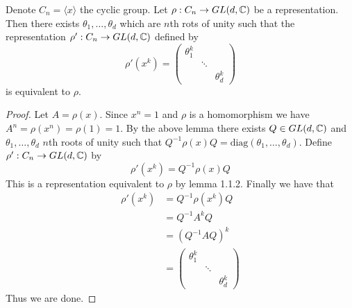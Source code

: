 \documentclass[a4paper]{article}
\begin{document}
\begin{thm}{}{} Denote $C_n=\langle x\rangle$ the cyclic group. Let $\rho:C_n\to GL(d,\mathbb{C})$ be a representation. Then there exists $\theta_1,\dots,\theta_d$ which are $n$th rots of unity such that the representation $\rho':C_n\to GL(d,\mathbb{C})$ defined by $$\rho'(x^k)=\begin{pmatrix}
\theta_1^k & & \\
& \ddots &\\
& & \theta_d^k
\end{pmatrix}$$ is equivalent to $\rho$. \tcbline
\begin{proof}
Let $A=\rho(x)$. Since $x^n=1$ and $\rho$ is a homomorphism we have $A^n=\rho(x^n)=\rho(1)=1$. By the above lemma there exists $Q\in GL(d,\mathbb{C})$ and $\theta_1,\dots,\theta_d$ $n$th roots of unity such that $Q^{-1}\rho(x)Q=\text{diag}(\theta_1,\dots,\theta_d)$. Define $\rho':C_n\to GL(d,\mathbb{C})$ by $$\rho'(x^k)=Q^{-1}\rho(x)Q$$ This is a representation equivalent to $\rho$ by lemma 1.1.2. Finally we have that 
\begin{align*}
\rho'(x^k)&=Q^{-1}\rho(x^k)Q\\
&=Q^{-1}A^kQ\\
&=(Q^{-1}AQ)^k\\
&=\begin{pmatrix}
\theta_1^k & & \\
& \ddots &\\
& & \theta_d^k
\end{pmatrix}
\end{align*} Thus we are done. 
\end{proof}
\end{thm}
\end{document}
